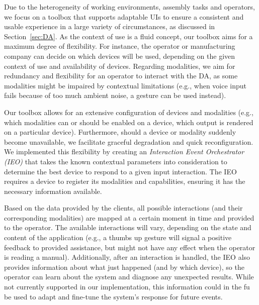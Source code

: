 Due to the heterogeneity of working environments, assembly tasks and operators, we focus on a toolbox that supports adaptable UIs to ensure a consistent and usable experience in a large variety of circumstances, as discussed in Section~\ref{sec:DA}. As the context of use is a fluid concept, our toolbox aims for a maximum degree of flexibility. For instance, the operator or manufacturing company can decide on which devices will be used, depending on the given context of use and availability of devices. Regarding modalities, we aim for redundancy and flexibility for an operator to interact with the DA, as some modalities might be impaired by contextual limitations (e.g., when voice input fails because of too much ambient noise, a gesture can be used instead).

Our toolbox allows for an extensive configuration of devices and modalities (e.g., which modalities can or should be enabled on a device, which output is rendered on a particular device). Furthermore, should a device or modality suddenly become unavailable, we facilitate graceful degradation and quick reconfiguration. We implemented this flexibility by creating an \emph{Interaction Event Orchestrator (IEO)} that takes the known contextual parameters into consideration to determine the best device to respond to a given input interaction. The IEO requires a device to register its modalities and capabilities, ensuring it has the necessary information available.

Based on the data provided by the clients, all possible interactions (and their corresponding modalities) are mapped at a certain moment in time and provided to the operator. The available interactions will vary, depending on the state and content of the application (e.g., a thumbs up gesture will signal a positive feedback to provided assistance, but might not have any effect when the operator is reading a manual). Additionally, after an interaction is handled, the IEO also provides information about what just happened (and by which device), so the operator can learn about the system and diagnose any unexpected results. While not currently supported in our implementation, this information could in the fu be used to adapt and fine-tune the system's response for future events.

